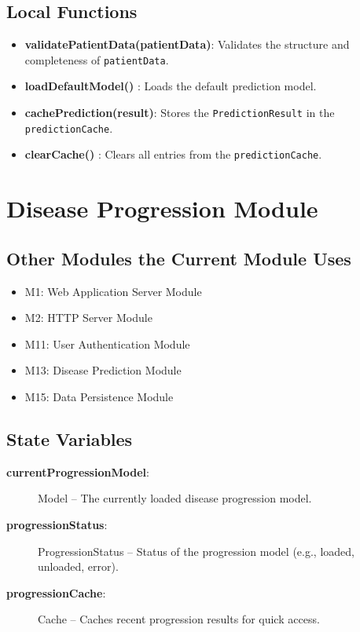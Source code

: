 \documentclass[12pt, titlepage]{article}
\begin{document}
\subsection{Local Functions}
\begin{itemize}
    \item \textbf{validatePatientData(patientData)}: Validates the structure and completeness of \texttt{patientData}.
    \item \textbf{loadDefaultModel()} : Loads the default prediction model.
    \item \textbf{cachePrediction(result)}: Stores the \texttt{PredictionResult} in the \texttt{predictionCache}.
    \item \textbf{clearCache()} : Clears all entries from the \texttt{predictionCache}.
\end{itemize}

\section{Disease Progression Module}
\label{Disease Progression Module}

\subsection{Other Modules the Current Module Uses}
\begin{itemize}
    \item M1: Web Application Server Module
    \item M2: HTTP Server Module
    \item M11: User Authentication Module
    \item M13: Disease Prediction Module 
    \item M15: Data Persistence Module
\end{itemize}

\subsection{State Variables}
\begin{description}
    \item[\textbf{currentProgressionModel}:] Model -- The currently loaded disease progression model.
    \item[\textbf{progressionStatus}:] ProgressionStatus -- Status of the progression model (e.g., loaded, unloaded, error).
    \item[\textbf{progressionCache}:] Cache -- Caches recent progression results for quick access.
\end{description}
\end{document}
